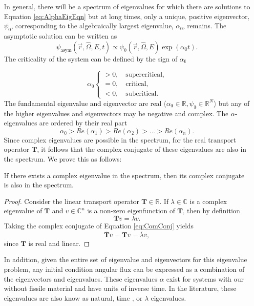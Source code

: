 In general, there will be a spectrum of eigenvalues for which there are solutions to Equation \ref{eq:AlphaEigEqn} but at long times, only a unique, positive eigenvector, $\psi_{0}$,  corresponding to the algebraically largest eigenvalue, $\alpha_{0}$, remains. The asymptotic solution can be written as \cite{nelkin_asymptotic_1963}
\begin{equation}
	\psi_{\text{asym}}(\vec{r},\hat{\Omega},E,t) \propto \psi_{0}(\vec{r},\hat{\Omega},E) \exp(\alpha_{0} t).
\end{equation}
The criticality of the system can be defined by the sign of $\alpha_{0}$

	$$ \alpha_{0} \begin{cases}						  			  			 > 0, \quad \text{supercritical,} \\			 			 			 = 0, \quad \text{critical,} \\
					 < 0, \quad \text{subcritical.} 					                       \end{cases} $$
The fundamental eigenvalue and eigenvector are real ($\alpha_{0} \in \mathbb{R}, \psi_{0} \in \mathbb{R}^{N}$) but any of the higher eigenvalues and eigenvectors may be negative and complex. 
The $\alpha$-eigenvalues are ordered by their real part
\begin{equation}
	\alpha_{0} > Re(\alpha_{1}) > Re(\alpha_{2}) > \dots > Re(\alpha_{n}).
\end{equation}
Since complex eigenvalues are possible in the spectrum, for the real transport operator $\mathbf{T}$, it follows that the complex conjugate of these eigenvalues are also in the spectrum. We prove this as follows:
\begin{theorem}
If there exists a complex eigenvalue in the spectrum, then its complex conjugate is also in the spectrum.
\end{theorem}
\begin{proof}
	Consider the linear transport operator $\mathbf{T} \in \mathbb{R}$. If $\lambda \in \mathbb{C}$ is a complex eigenvalue of $\mathbf{T}$ and $v \in \mathbb{C}^{n}$ is a non-zero eigenfunction of $\mathbf{T}$, then by definition
	\begin{equation}
		\mathbf{T} v = \lambda v.
		\label{eq:ComConj}
	\end{equation}
Taking the complex conjugate of Equation \ref{eq:ComConj} yields
\begin{equation}
	\overline{\mathbf{T}}\overline{v} = \mathbf{T} \overline{v} = \overline{\lambda}\overline{v},
	\end{equation}
since $\mathbf{T}$ is real and linear.
\end{proof}
In addition, given the entire set of eigenvalue and eigenvectors for this eigenvalue problem, any initial condition angular flux can be expressed as a combination of the eigenvectors and eigenvalues. These eigenvalues $\alpha$ exist for systems with our without fissile material and have units of inverse time. In the literature, these eigenvalues are also know as natural, time \cite{hill_efficient_1983}, or $\lambda$ \cite{duderstadt_nuclear_1976} eigenvalues.

